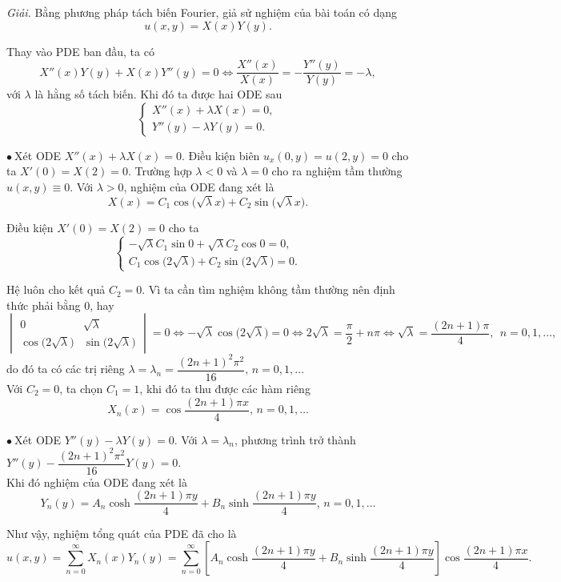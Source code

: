 \documentclass[10pt, a4paper]{article}
\begin{document}
	\textit{Giải.} Bằng phương pháp tách biến Fourier, giả sử nghiệm của bài toán có dạng $$u(x,y)=X(x)Y(y).$$
	
	Thay vào PDE ban đầu, ta có $$X''(x)Y(y)+X(x)Y''(y)=0\iff\frac{X''(x)}{X(x)}=-\frac{Y''(y)}{Y(y)}=-\lambda,$$
	với $\lambda$ là hằng số tách biến. Khi đó ta được hai ODE sau $$\begin{cases}
		X''(x)+\lambda X(x)=0,\\
		Y''(y)-\lambda Y(y)=0.
	\end{cases}$$
	
	$\bullet~$Xét ODE $X''(x)+\lambda X(x)=0$. Điều kiện biên $u_x(0,y)=u(2,y)=0$ cho ta $X'(0)=X(2)=0$. Trường hợp $\lambda<0$ và $\lambda=0$ cho ra nghiệm tầm thường $u(x,y)\equiv0$. Với $\lambda>0$, nghiệm của ODE đang xét là $$X(x)=C_1\cos\big(\sqrt\lambda x\big)+C_2\sin\big(\sqrt\lambda x\big).$$
	
	Điều kiện $X'(0)=X(2)=0$ cho ta $$\begin{cases}
		-\sqrt\lambda C_1\sin0+\sqrt\lambda C_2\cos0=0,\\
		C_1\cos\big(2\sqrt\lambda\big)+C_2\sin\big(2\sqrt\lambda\big)=0.
	\end{cases}$$
	
	Hệ luôn cho kết quả $C_2=0$. Vì ta cần tìm nghiệm không tầm thường nên định thức phải bằng 0, hay $$\begin{vmatrix}
		0&\sqrt\lambda\\
		\cos\big(2\sqrt\lambda\big)&\sin\big(2\sqrt\lambda\big)
	\end{vmatrix}=0\iff-\sqrt\lambda\cos\big(2\sqrt\lambda\big)=0\iff2\sqrt\lambda=\frac\pi2+n\pi\iff\sqrt\lambda=\frac{(2n+1)\pi}{4},~~n=0,1,\ldots,$$
	do đó ta có các trị riêng $\lambda=\lambda_n=\dfrac{(2n+1)^2\pi^2}{16},\,n=0,1,\ldots$\\
	
	Với $C_2=0$, ta chọn $C_1=1$, khi đó ta thu được các hàm riêng $$X_n(x)=\cos\frac{(2n+1)\pi x}{4},\,n=0,1,\ldots$$
	
	$\bullet~$Xét ODE $Y''(y)-\lambda Y(y)=0$. Với $\lambda=\lambda_n$, phương trình trở thành $Y''(y)-\dfrac{(2n+1)^2\pi^2}{16}Y(y)=0$.\\
	
	Khi đó nghiệm của ODE đang xét là $$Y_n(y)=A_n\cosh\frac{(2n+1)\pi y}{4}+B_n\sinh\frac{(2n+1)\pi y}{4},\,n=0,1,\ldots$$
	
	Như vậy, nghiệm tổng quát của PDE đã cho là $$u(x,y)=\sum_{n=0}^\infty X_n(x)Y_n(y)=\sum_{n=0}^\infty\left[A_n\cosh\frac{(2n+1)\pi y}{4}+B_n\sinh\frac{(2n+1)\pi y}{4}\right]\cos\frac{(2n+1)\pi x}{4}.$$
	
\end{document}
